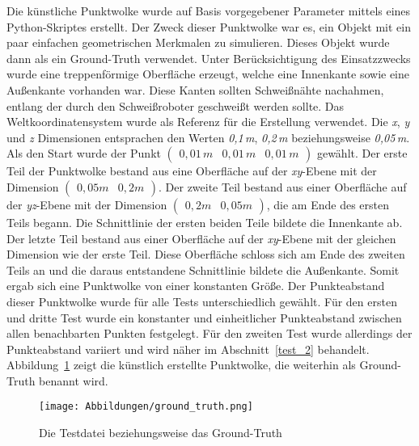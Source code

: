 Die künstliche Punktwolke wurde auf Basis vorgegebener Parameter mittels eines Python-Skriptes erstellt. Der Zweck dieser Punktwolke war es, ein Objekt mit ein paar einfachen geometrischen Merkmalen zu simulieren. Dieses Objekt wurde dann als ein Ground-Truth verwendet. Unter Berücksichtigung des Einsatzzwecks wurde eine treppenförmige Oberfläche erzeugt, welche eine Innenkante sowie eine Außenkante vorhanden war. Diese Kanten sollten Schweißnähte nachahmen, entlang der durch den Schweißroboter geschweißt werden sollte. Das Weltkoordinatensystem wurde als Referenz für die Erstellung verwendet. Die \textit{x}, \textit{y} und \textit{z} Dimensionen entsprachen den Werten \textit{0,1\,m}, \textit{0,2\,m} beziehungsweise \textit{0,05\,m}. Als den Start wurde der Punkt $\left(\begin{smallmatrix}
	0,01\,m & 0,01\,m & 0,01\,m
\end{smallmatrix}\right)$ gewählt. Der erste Teil der Punktwolke bestand aus eine Oberfläche auf der \textit{xy}-Ebene mit der Dimension $\left(\begin{smallmatrix}
0,05m & 0,2m
\end{smallmatrix}\right)$. Der zweite Teil bestand aus einer Oberfläche auf der \textit{yz}-Ebene mit der Dimension $\left(\begin{smallmatrix}
0,2m & 0,05m
\end{smallmatrix}\right)$, die am Ende des ersten Teils begann. Die Schnittlinie der ersten beiden Teile bildete die Innenkante ab. Der letzte Teil bestand aus einer Oberfläche auf der \textit{xy}-Ebene mit der gleichen Dimension wie der erste Teil. Diese Oberfläche schloss sich am Ende des zweiten Teils an und die daraus entstandene Schnittlinie bildete die Außenkante. Somit ergab sich eine Punktwolke von einer konstanten Größe. Der Punkteabstand dieser Punktwolke wurde für alle Tests unterschiedlich gewählt. Für den ersten und dritte Test wurde ein konstanter und einheitlicher Punkteabstand zwischen allen benachbarten Punkten festgelegt. Für den zweiten Test wurde allerdings der Punkteabstand variiert und wird näher im Abschnitt~\ref{test_2} behandelt. Abbildung~\ref{fig: ground_truth} zeigt die künstlich erstellte Punktwolke, die weiterhin als Ground-Truth benannt wird. 

\begin{figure}[t]
	\texttt{[image: Abbildungen/ground\_truth.png]}
	\centering
	\caption[ground truth]{Die Testdatei beziehungsweise das Ground-Truth}
	\label{fig: ground_truth}
\end{figure}

